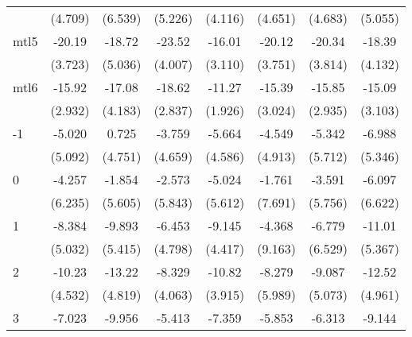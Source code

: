 \documentclass{article}
\begin{document}
{\begin{longtable}{l*{7}{c}}
                &  (4.709)         &  (6.539)         &  (5.226)         &  (4.116)         &  (4.651)         &  (4.683)         &  (5.055)         \\
mtl5            &   -20.19\sym{***}&   -18.72\sym{***}&   -23.52\sym{***}&   -16.01\sym{***}&   -20.12\sym{***}&   -20.34\sym{***}&   -18.39\sym{***}\\
                &  (3.723)         &  (5.036)         &  (4.007)         &  (3.110)         &  (3.751)         &  (3.814)         &  (4.132)         \\
mtl6            &   -15.92\sym{***}&   -17.08\sym{***}&   -18.62\sym{***}&   -11.27\sym{***}&   -15.39\sym{***}&   -15.85\sym{***}&   -15.09\sym{***}\\
                &  (2.932)         &  (4.183)         &  (2.837)         &  (1.926)         &  (3.024)         &  (2.935)         &  (3.103)         \\
-1              &   -5.020         &    0.725         &   -3.759         &   -5.664         &   -4.549         &   -5.342         &   -6.988         \\
                &  (5.092)         &  (4.751)         &  (4.659)         &  (4.586)         &  (4.913)         &  (5.712)         &  (5.346)         \\
0               &   -4.257         &   -1.854         &   -2.573         &   -5.024         &   -1.761         &   -3.591         &   -6.097         \\
                &  (6.235)         &  (5.605)         &  (5.843)         &  (5.612)         &  (7.691)         &  (5.756)         &  (6.622)         \\
1               &   -8.384         &   -9.893         &   -6.453         &   -9.145\sym{*}  &   -4.368         &   -6.779         &   -11.01\sym{*}  \\
                &  (5.032)         &  (5.415)         &  (4.798)         &  (4.417)         &  (9.163)         &  (6.529)         &  (5.367)         \\
2               &   -10.23\sym{*}  &   -13.22\sym{*}  &   -8.329         &   -10.82\sym{*}  &   -8.279         &   -9.087         &   -12.52\sym{*}  \\
                &  (4.532)         &  (4.819)         &  (4.063)         &  (3.915)         &  (5.989)         &  (5.073)         &  (4.961)         \\
3               &   -7.023         &   -9.956\sym{*}  &   -5.413         &   -7.359\sym{*}  &   -5.853         &   -6.313         &   -9.144\sym{*}  \\

\end{longtable}}
\end{document}
